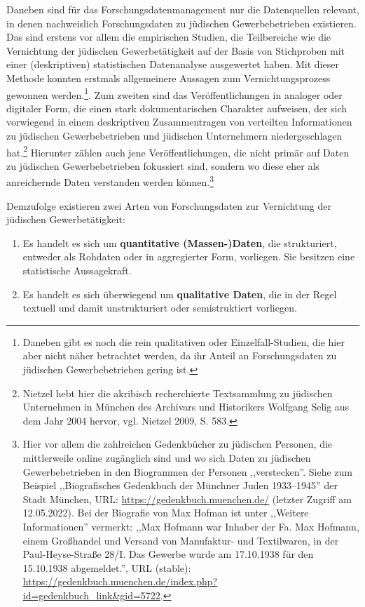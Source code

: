Daneben sind für das Forschungsdatenmanagement nur die Datenquellen relevant, in denen nachweislich Forschungsdaten zu jüdischen Gewerbebetrieben existieren. Das sind erstens vor allem die empirischen Studien, die Teilbereiche wie die Vernichtung der jüdischen Gewerbetätigkeit auf der Basis von Stichproben mit einer (deskriptiven) statistischen Datenanalyse ausgewertet haben. Mit dieser Methode konnten erstmals allgemeinere Aussagen zum Vernichtungsprozess gewonnen werden.\footnote{Daneben gibt es noch die rein qualitativen oder Einzelfall-Studien, die hier aber nicht näher betrachtet werden, da ihr Anteil an Forschungsdaten zu jüdischen Gewerbebetrieben gering ist.}. Zum zweiten sind das Veröffentlichungen in analoger oder digitaler Form, die einen stark dokumentarischen Charakter aufweisen, der sich vorwiegend in einem deskriptiven Zusammentragen von verteilten Informationen zu jüdischen Gewerbebetrieben und jüdischen Unternehmern niedergeschlagen hat.\footnote{Nietzel hebt hier die akribisch recherchierte Textsammlung zu jüdischen Unternehmen in München des Archivars und Historikers Wolfgang Selig aus dem Jahr 2004 hervor, vgl. Nietzel 2009, S. 583.} Hierunter zählen auch jene Veröffentlichungen, die nicht primär auf Daten zu jüdischen Gewerbebetrieben fokussiert sind, sondern wo diese eher als anreichernde Daten verstanden werden können.\footnote{Hier vor allem die zahlreichen Gedenkbücher zu jüdischen Personen, die mittlerweile online zugänglich sind und wo sich Daten zu jüdischen Gewerbebetrieben in den Biogrammen der Personen ,,verstecken''. Siehe zum Beispiel ,,Biografisches Gedenkbuch der Münchner Juden 1933–1945'' der Stadt München, URL: \url{https://gedenkbuch.muenchen.de/} (letzter Zugriff am 12.05.2022). Bei der Biografie von Max Hofman ist unter ,,Weitere Informationen'' vermerkt: ,,Max Hofmann war Inhaber der Fa. Max Hofmann, einem Großhandel und Versand von Manufaktur- und Textilwaren, in der Paul-Heyse-Straße 28/I. Das Gewerbe wurde am 17.10.1938 für den 15.10.1938 abgemeldet.'', URL (stable): \url{https://gedenkbuch.muenchen.de/index.php?id=gedenkbuch_link&gid=5722}.}

Demzufolge existieren zwei Arten von Forschungsdaten zur Vernichtung der jüdischen Gewerbetätigkeit:

\begin{enumerate}
    \item Es handelt es sich um \textbf{quantitative (Massen-)Daten}, die strukturiert, entweder als Rohdaten oder in aggregierter Form, vorliegen. Sie besitzen eine statistische Aussagekraft.
    \item Es handelt es sich überwiegend um \textbf{qualitative Daten}, die in der Regel textuell und damit unstrukturiert oder semistruktiert vorliegen.
\end{enumerate}

